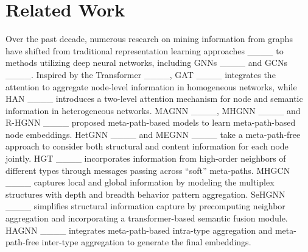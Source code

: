 \section{Related Work}

Over the past decade, numerous research on mining information from graphs have shifted from traditional representation learning approaches ____ to methods utilizing deep neural networks, including GNNs ____ and GCNs ____. Inspired by the Transformer ____, GAT ____ integrates the attention to aggregate node-level information in homogeneous networks, while HAN ____ introduces a two-level attention mechanism for node and semantic information in heterogeneous networks. MAGNN ____, MHGNN ____ and R-HGNN ____ proposed meta-path-based models to learn meta-path-based node embeddings. HetGNN ____ and MEGNN ____ take a meta-path-free approach to consider both structural and content information for each node jointly. HGT ____ incorporates information from high-order neighbors of different types through messages passing across ``soft'' meta-paths. MHGCN ____ captures local and global information by modeling the multiplex structures with depth and breadth behavior pattern aggregation. SeHGNN ____ simplifies structural information capture by precomputing neighbor aggregation and incorporating a transformer-based semantic fusion module. HAGNN ____ integrates meta-path-based intra-type aggregation and meta-path-free inter-type aggregation to generate the final embeddings. 



